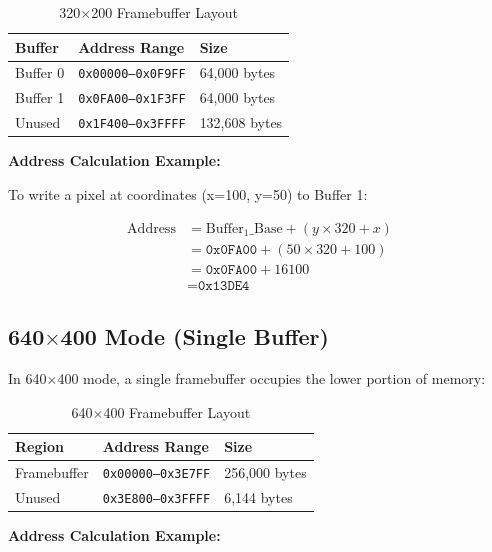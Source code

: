 \documentclass[11pt,letterpaper]{report}
\begin{document}
\begin{table}[tbp]
\centering
\caption{320$\times$200 Framebuffer Layout}
\label{tab:fb_320_layout}
\begin{tabular}{lll}
\toprule
\textbf{Buffer} & \textbf{Address Range} & \textbf{Size} \\
\midrule
Buffer 0 & \texttt{0x00000--0x0F9FF} & 64,000 bytes \\
Buffer 1 & \texttt{0x0FA00--0x1F3FF} & 64,000 bytes \\
Unused   & \texttt{0x1F400--0x3FFFF} & 132,608 bytes \\
\bottomrule
\end{tabular}
\end{table}

\textbf{Address Calculation Example:}

To write a pixel at coordinates (x=100, y=50) to Buffer 1:

\begin{equation}
\begin{aligned}
\text{Address} &= \text{Buffer}_1\text{\_Base} + (y \times 320 + x) \\
               &= \texttt{0x0FA00} + (50 \times 320 + 100) \\
               &= \texttt{0x0FA00} + 16100 \\
               &= \texttt{0x13DE4}
\end{aligned}
\end{equation}

\subsection{640$\times$400 Mode (Single Buffer)}

In 640$\times$400 mode, a single framebuffer occupies the lower portion of memory:

\begin{table}[tbp]
\centering
\caption{640$\times$400 Framebuffer Layout}
\label{tab:fb_640_layout}
\begin{tabular}{lll}
\toprule
\textbf{Region} & \textbf{Address Range} & \textbf{Size} \\
\midrule
Framebuffer & \texttt{0x00000--0x3E7FF} & 256,000 bytes \\
Unused & \texttt{0x3E800--0x3FFFF} & 6,144 bytes \\
\bottomrule
\end{tabular}
\end{table}

\textbf{Address Calculation Example:}
\end{document}

